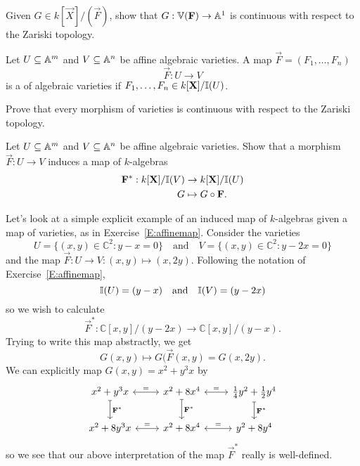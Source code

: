 \documentclass{ximera}
\begin{document}
\begin{exercise}
  Given $G\in k[\vec{X}]/(\vec{F})$, show that $G: \mathbb V(\mathbf{F})\to
  \mathbb A^1$ is continuous with respect to the Zariski topology.
\end{exercise}



\begin{definition}
  Let $U\subseteq\mathbb A^m$ and $V\subseteq\mathbb A^n$ be affine algebraic
  varieties. A map $\vec{F} = (F_1,\dots,F_n)$
  \[
  \vec{F}: U\to V
  \]
  is a  of algebraic varieties if $F_1,\dots,F_n\in k[\mathbf X]/\mathbb I(U)$.
\end{definition}

\begin{exercise}
  Prove that every morphism of varieties is continuous with respect to
  the Zariski topology.
\end{exercise}

\begin{exercise}\label{E:affinemap}
   Let $U\subseteq\mathbb A^m$ and $V\subseteq\mathbb A^n$ be affine algebraic varieties. Show that a
   morphism $\vec{F}: U\to V$ induces a map of $k$-algebras
   \begin{align*}
     \mathbf{F}^*:  k[\mathbf X]/\mathbb I(V) &\to k[\mathbf X]/\mathbb I(U)\\
     G &\mapsto G\circ \mathbf{F}.
    \end{align*}
\end{exercise}


\begin{example}
	Let's look at a simple explicit example of an induced map of
        $k$-algebras given a map of varieties, as in
        Exercise~\ref{E:affinemap}. Consider the varieties
	\[
	U=\{(x,y)\in\mathbb C^2:y-x=0\} \quad\text{and}\quad
	V=\{(x,y)\in\mathbb C^2:y-2x=0\}
	\]
	and the map $\vec F:U\to V:(x,y)\mapsto(x,2y)$. Following the notation of Exercise~\ref{E:affinemap},
	\[
	\mathbb I(U)=(y-x) \quad\text{and}\quad
	\mathbb I(V)=(y-2x)
	\]
	so we wish to calculate
	\[
	\vec F^*:\mathbb C[x,y]/(y-2x)\to\mathbb C[x,y]/(y-x).
	\]
	Trying to write this map abstractly, we get
        \[
        G(x,y)\mapsto G(\vec F(x,y)=G(x,2y).
        \]
        We can explicitly map $G(x,y)=x^2+y^3x$ by
	\begin{equation*}
	\begin{tikzcd}
	x^2+y^3x \arrow[leftrightarrow]{r}{=}\arrow[mapsto]{d}{\vec F^*} & x^2+8x^4 \arrow[leftrightarrow]{r}{=}\arrow[mapsto]{d}{\vec F^*} & \tfrac14y^2+\tfrac12y^4 \arrow[mapsto]{d}{\vec F^*}\\
	x^2+8y^3x \arrow[leftrightarrow]{r}{=} & x^2+8x^4 \arrow[leftrightarrow]{r}{=} & y^2+8y^4
	\end{tikzcd}
	\end{equation*}
	so we see that our above interpretation of the map $\vec F^*$ really is well-defined.
\end{example}
\end{document}
